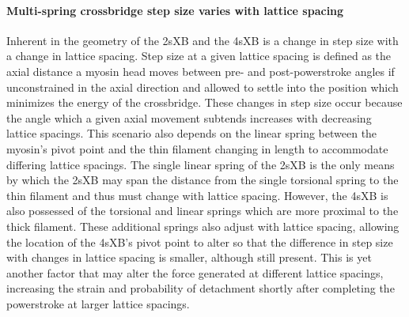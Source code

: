 \documentclass[]{article}
\begin{document}
\paragraph{Multi-spring crossbridge step size varies with lattice spacing} %
Inherent in the geometry of the 2sXB and the 4sXB is a change in step size with a change in lattice spacing.
Step size at a given lattice spacing is defined as the axial distance a myosin head moves between pre- and post-powerstroke angles if unconstrained in the axial direction and allowed to settle into the position which minimizes the energy of the crossbridge.
These changes in step size occur because the angle which a given axial movement subtends increases with decreasing lattice spacings.
This scenario also depends on the linear spring between the myosin's pivot point and the thin filament changing in length to accommodate differing lattice spacings.
The single linear spring of the 2sXB is the only means by which the 2sXB may span the distance from the single torsional spring to the thin filament and thus must change with lattice spacing.
However, the 4sXB is also possessed of the torsional and linear springs which are more proximal to the thick filament.
These additional springs also adjust with lattice spacing, allowing the location of the 4sXB's pivot point to alter so that the difference in step size with changes in lattice spacing is smaller, although still present.
This is yet another factor that may alter the force generated at different lattice spacings, increasing the strain and probability of detachment shortly after completing the powerstroke at larger lattice spacings.

\end{document}
